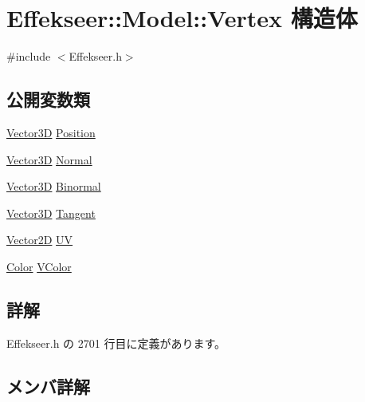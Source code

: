 \hypertarget{struct_effekseer_1_1_model_1_1_vertex}{}\section{Effekseer\+:\+:Model\+:\+:Vertex 構造体}
\label{struct_effekseer_1_1_model_1_1_vertex}


{\ttfamily \#include $<$Effekseer.\+h$>$}

\subsection*{公開変数類}
\begin{DoxyCompactItemize}
\item 
\mbox{\hyperlink{struct_effekseer_1_1_vector3_d}{Vector3D}} \mbox{\hyperlink{struct_effekseer_1_1_model_1_1_vertex_ab60ea714b94ff69deea1ce8c4ab5b2af}{Position}}
\item 
\mbox{\hyperlink{struct_effekseer_1_1_vector3_d}{Vector3D}} \mbox{\hyperlink{struct_effekseer_1_1_model_1_1_vertex_ad06ee8e47ca58d8da3ec6ba9aac1854e}{Normal}}
\item 
\mbox{\hyperlink{struct_effekseer_1_1_vector3_d}{Vector3D}} \mbox{\hyperlink{struct_effekseer_1_1_model_1_1_vertex_adc3b1c24c0a4ad31aa3baeeaeab77454}{Binormal}}
\item 
\mbox{\hyperlink{struct_effekseer_1_1_vector3_d}{Vector3D}} \mbox{\hyperlink{struct_effekseer_1_1_model_1_1_vertex_a5140b60278c5fb4b6d99afbf7966eb1a}{Tangent}}
\item 
\mbox{\hyperlink{struct_effekseer_1_1_vector2_d}{Vector2D}} \mbox{\hyperlink{struct_effekseer_1_1_model_1_1_vertex_a4b16f6ed12f2a67a6064728c7fe37d7f}{UV}}
\item 
\mbox{\hyperlink{struct_effekseer_1_1_color}{Color}} \mbox{\hyperlink{struct_effekseer_1_1_model_1_1_vertex_a41a843c2f7d16433de79a01837a91a7f}{V\+Color}}
\end{DoxyCompactItemize}


\subsection{詳解}


 Effekseer.\+h の 2701 行目に定義があります。



\subsection{メンバ詳解}
\mbox{\label{struct_effekseer_1_1_model_1_1_vertex_adc3b1c24c0a4ad31aa3baeeaeab77454}} 
